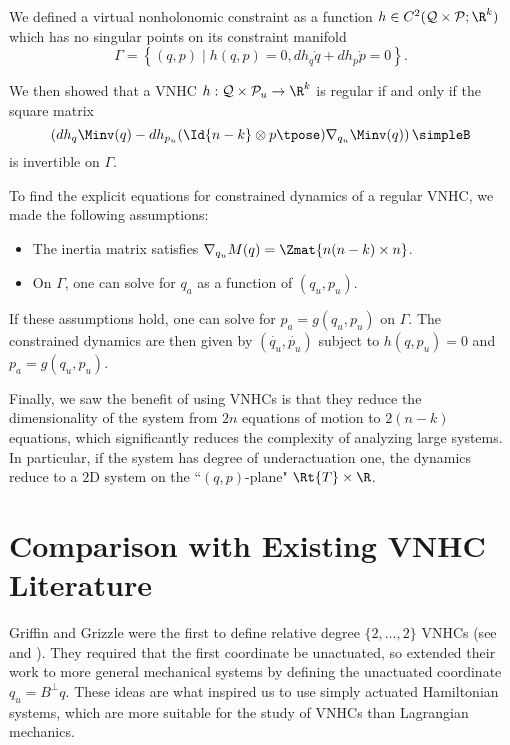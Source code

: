 We defined a virtual nonholonomic
constraint as a function 
\(h \in C^2(\mathcal{Q}\times\mathcal{P}; \R^k)\) 
which has no singular points on its constraint manifold
\[
    \Gamma = \left\{(q,p) \mid h(q,p) = 0, dh_q \dot{q} + dh_p \dot{p} = 0\right\}
    .
\]

We then showed that a VNHC 
\(h : \mathcal{Q} \times \mathcal{P}_u \rightarrow \R^k\) is regular if and only
if the square matrix
\[
    \left(
    dh_q \Minv(q) - 
    dh_{p_u} (\Id{n-k} \otimes p\tpose)\nabla_{q_u}\Minv(q) 
    \right)
    \simpleB
\]
is invertible on \(\Gamma\).

To find the explicit equations for constrained dynamics of a regular VNHC, 
we made the following assumptions:
\begin{itemize}
    \item The inertia matrix satisfies 
        \(\nabla_{q_u}M(q) = \Zmat{n(n-k) \times n}\).
    \item On \(\Gamma\), one can solve for \(q_a\) as a function of
        \((q_u,p_u)\).
\end{itemize}
If these assumptions hold, one can solve for \(p_a = g(q_u,p_u)\) on \(\Gamma\).
The constrained dynamics are then given by
\((\dot{q_u}, \dot{p_u})\) subject to \(h(q,p_u) = 0\) and \(p_a = g(q_u,p_u)\).

Finally, we saw the benefit of using VNHCs is that they reduce the
dimensionality of the system from \(2n\) equations of motion to \(2(n-k)\)
equations, which significantly reduces the complexity of analyzing large systems.
In particular, if the system has degree of underactuation one, the dynamics
reduce to a \(2\)D system on the ``\((q,p)\)-plane" \(\Rt{T}\times\R\).

\section{Comparison with Existing VNHC Literature}\label{ch:vnhc-compare}

Griffin and Grizzle were the first to define relative degree \(\{2,\ldots,2\}\)
VNHCs (see \cite{nhvc_dynamic_walking} and \cite{nhvc_gait_optimization}). 
They required that the first coordinate be unactuated, so 
\citet{hybrid_zero_dynamics_bipedal_nhvcs} extended their work to more general
mechanical systems by defining the unactuated coordinate \(q_u = B^\perp q\).
These ideas are what inspired us to use simply actuated Hamiltonian systems,
which are more suitable for the study of VNHCs than Lagrangian mechanics. 

